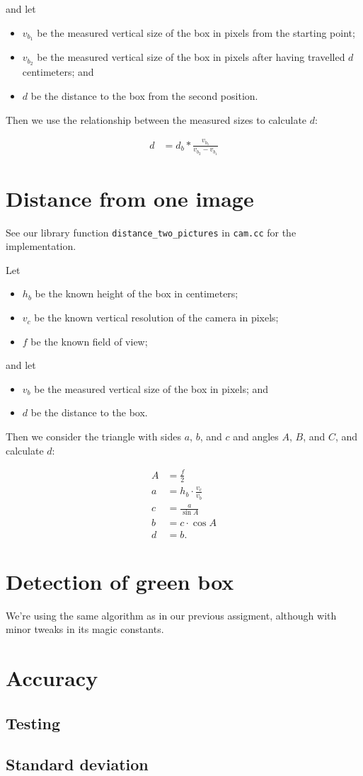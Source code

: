 \documentclass[a4paper,12pt]{article}
\begin{document}
and let

\begin{itemize}
\item $v_{b_1}$ be the measured vertical size of the box in pixels from the
starting point;
\item $v_{b_2}$ be the measured vertical size of the box in pixels after having
travelled $d$ centimeters; and
\item $d$ be the distance to the box from the second position.
\end{itemize}

Then we use the relationship between the measured sizes to calculate $d$:

\begin{align*}
  d &= d_b * \frac{v_{b_1}}{v_{b_2} - v_{b_1}}
\end{align*}


\section{Distance from one image}

See our library function \texttt{distance_two_pictures} in \texttt{cam.cc} for
the implementation.

Let
\begin{itemize}
\item $h_b$ be the known height of the box in centimeters;
\item $v_c$ be the known vertical resolution of the camera in pixels;
\item $f$ be the known field of view;
\end{itemize}

and let
\begin{itemize}
\item $v_b$ be the measured vertical size of the box in pixels; and
\item $d$ be the distance to the box.
\end{itemize}

Then we consider the triangle with sides $a$, $b$, and $c$ and angles $A$, $B$,
and $C$, and calculate $d$:

\begin{align*}
  A &= \frac{f}{2}\\
  a &= h_b \cdot \frac{v_c}{v_b}\\
  c &= \frac{a}{\sin A}\\
  b &= c \cdot \cos A\\
  d &= b.
\end{align*}


\section{Detection of green box}

We're using the same algorithm as in our previous assigment, although with minor
tweaks in its magic constants.


\section{Accuracy}

\subsection{Testing}

\subsection{Standard deviation}
\end{document}
